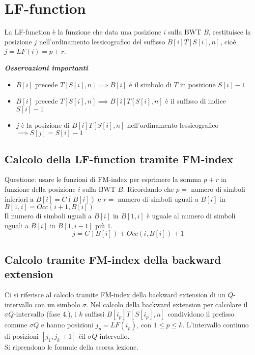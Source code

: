 \section{LF-function}
La LF-function è la funzione che data una posizione $i$ sulla BWT $B$, restituisce la posizione $j$ nell’ordinamento lessicografico del suffisso $B[i] T[S[i],n]$, cioè $j = LF(i) = p+r$.

\textbf{\textit{Osservazioni importanti}}
\begin{itemize}
    \item $B[i]$ precede $T[S[i],n] \implies B[i]$ è il simbolo di $T$ in posizione $S[i]-1$
    \item $B[i]$ precede $T[S[i],n] \implies B[i] T[S[i],n]$ è il suffisso di indice $S[i]-1$
    \item $j$ è la posizione di $B[i]T[S[i],n]$ nell’ordinamento lessicografico $\implies S[j] = S[i]-1$
\end{itemize}

\subsection{Calcolo della LF-function tramite FM-index}

Questione: usare le funzioni di FM-index per esprimere la somma $p + r$ in funzione della posizione $i$ sulla BWT $B$. Ricordando che $p = $ numero di simboli inferiori a $B[i] = C(B[i])$ e $r = $ numero di simboli uguali a $B[i]$ in $B[1,i] = Occ(i+ 1, B[i])$\\
Il numero di simboli uguali a $B[i]$ in $B[1,i]$ è uguale al numero di simboli uguali a $B[i]$ in $B[1, i-1]$ più $1$.
\[j = C(B[i]) + Occ(i, B[i]) + 1\]

\subsection{Calcolo tramite FM-index della backward extension}
Ci si riferisce al calcolo tramite FM-index della backward extension di un $Q$-intervallo con un simbolo $\sigma$. Nel calcolo della backward extension per calcolare il $\sigma Q$-intervallo (fase 4.), i $k$ suffissi $B[i_p]T[S[i_p], n]$ condividono il prefisso comune $\sigma Q$ e hanno posizioni $j_p = LF(i_p)$, con $1 \leq p \leq k$.
L’intervallo continuo di posizioni $[j_1, j_k+1]$ èil $\sigma Q$-intervallo.\\

Si riprendono le formule della scorsa lezione. \\

